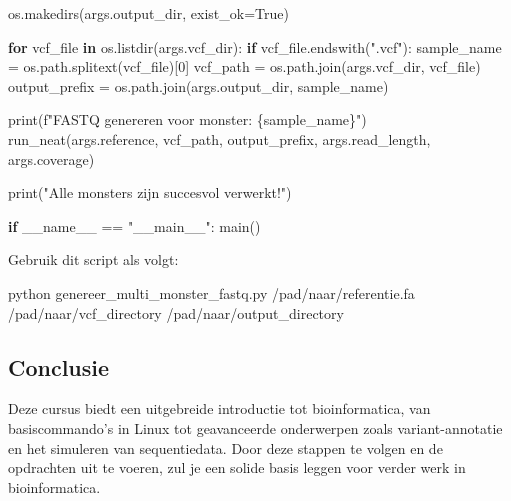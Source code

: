 \documentclass[
  letterpaper,
  DIV=11,
  numbers=noendperiod]{scrartcl}
\newenvironment{Shaded}{\begin{snugshade}}{\end{snugshade}}
\newcommand{\BuiltInTok}[1]{\textcolor[rgb]{0.00,0.23,0.31}{#1}}
\newcommand{\ControlFlowTok}[1]{\textcolor[rgb]{0.00,0.23,0.31}{\textbf{#1}}}
\newcommand{\DecValTok}[1]{\textcolor[rgb]{0.68,0.00,0.00}{#1}}
\newcommand{\ExtensionTok}[1]{\textcolor[rgb]{0.00,0.23,0.31}{#1}}
\newcommand{\KeywordTok}[1]{\textcolor[rgb]{0.00,0.23,0.31}{\textbf{#1}}}
\newcommand{\NormalTok}[1]{\textcolor[rgb]{0.00,0.23,0.31}{#1}}
\newcommand{\OperatorTok}[1]{\textcolor[rgb]{0.37,0.37,0.37}{#1}}
\newcommand{\SpecialCharTok}[1]{\textcolor[rgb]{0.37,0.37,0.37}{#1}}
\newcommand{\SpecialStringTok}[1]{\textcolor[rgb]{0.13,0.47,0.30}{#1}}
\newcommand{\StringTok}[1]{\textcolor[rgb]{0.13,0.47,0.30}{#1}}
\newcommand{\VariableTok}[1]{\textcolor[rgb]{0.07,0.07,0.07}{#1}}
\begin{document}
\begin{Shaded}
\begin{Highlighting}[]
\NormalTok{    os.makedirs(args.output\_dir, exist\_ok}\OperatorTok{=}\VariableTok{True}\NormalTok{)}

    \ControlFlowTok{for}\NormalTok{ vcf\_file }\KeywordTok{in}\NormalTok{ os.listdir(args.vcf\_dir):}
        \ControlFlowTok{if}\NormalTok{ vcf\_file.endswith(}\StringTok{".vcf"}\NormalTok{):}
\NormalTok{            sample\_name }\OperatorTok{=}\NormalTok{ os.path.splitext(vcf\_file)[}\DecValTok{0}\NormalTok{]}
\NormalTok{            vcf\_path }\OperatorTok{=}\NormalTok{ os.path.join(args.vcf\_dir, vcf\_file)}
\NormalTok{            output\_prefix }\OperatorTok{=}\NormalTok{ os.path.join(args.output\_dir, sample\_name)}

            \BuiltInTok{print}\NormalTok{(}\SpecialStringTok{f"FASTQ genereren voor monster: }\SpecialCharTok{\{}\NormalTok{sample\_name}\SpecialCharTok{\}}\SpecialStringTok{"}\NormalTok{)}
\NormalTok{            run\_neat(args.reference, vcf\_path, output\_prefix, args.read\_length, args.coverage)}

    \BuiltInTok{print}\NormalTok{(}\StringTok{"Alle monsters zijn succesvol verwerkt!"}\NormalTok{)}

\ControlFlowTok{if} \VariableTok{\_\_name\_\_} \OperatorTok{==} \StringTok{"\_\_main\_\_"}\NormalTok{:}
\NormalTok{    main()}
\end{Highlighting}
\end{Shaded}

Gebruik dit script als volgt:

\begin{Shaded}
\begin{Highlighting}[]
\ExtensionTok{python}\NormalTok{ genereer\_multi\_monster\_fastq.py /pad/naar/referentie.fa /pad/naar/vcf\_directory /pad/naar/output\_directory}
\end{Highlighting}
\end{Shaded}

\subsection{Conclusie}\label{conclusie}

Deze cursus biedt een uitgebreide introductie tot bioinformatica, van
basiscommando's in Linux tot geavanceerde onderwerpen zoals
variant-annotatie en het simuleren van sequentiedata. Door deze stappen
te volgen en de opdrachten uit te voeren, zul je een solide basis leggen
voor verder werk in bioinformatica.
\end{document}
